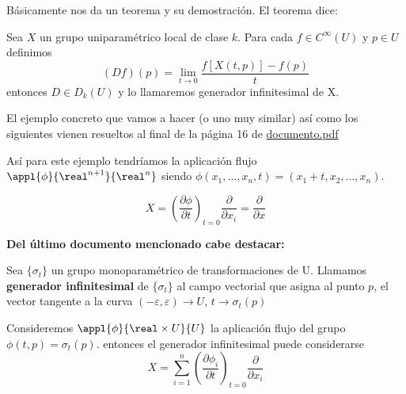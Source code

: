 \begin{problem}[1]
Básicamente nos da un teorema y su demostración. El teorema dice:

Sea $X$ un grupo uniparamétrico local de clase $k$. Para cada $f\in C^{\infty}(U)$ y $p \in U$ definimos
\[(Df)(p)=\lim_{t \to 0}\frac{f[X(t,p)]-f(p)}{t}\]
entonces $D \in D_k(U)$ y lo llamaremos generador infinitesimal de X.

El ejemplo concreto que vamos a hacer (o uno muy similar) así como los siguientes vienen resueltos al final de la página 16 de \href{http://matematicas.unex.es/~ricarfr/EcDiferenciales/LibroEDLat.pdf}{documento.pdf}

Así para este ejemplo tendríamos la aplicación flujo $\appl{\phi}{\real^{n+1}}{\real^n}$ siendo $\phi(x_1,...,x_n,t)=(x_1+t,x_2,...,x_n)$.

\[X = \left(\frac{\partial \phi}{\partial t}\right)_{t=0} \frac{\partial}{\partial x_i}=\frac{\partial}{\partial x}\]


\textbf{Del último documento mencionado cabe destacar:}

\begin{defn}
Sea $\{σ_t\}$ un grupo monoparamétrico de transformaciones de U. Llamamos \textbf{generador infinitesimal} de $\{σ_t\}$ al campo vectorial que asigna al punto $p$, el vector tangente a la curva $(-ε,ε)\to U$, $t \to σ_t(p)$

Consideremos $\appl{\phi}{\real \times U}{U}$ la aplicación flujo del grupo $\phi(t,p)=σ_t(p)$. entonces el generador infinitesimal puede considerarse
\[X = \sum_{i=1}^n \left( \frac{\partial \phi_i}{\partial t}\right)_{t=0}\frac{\partial}{\partial x_i}\]
\end{defn}

\end{problem}

